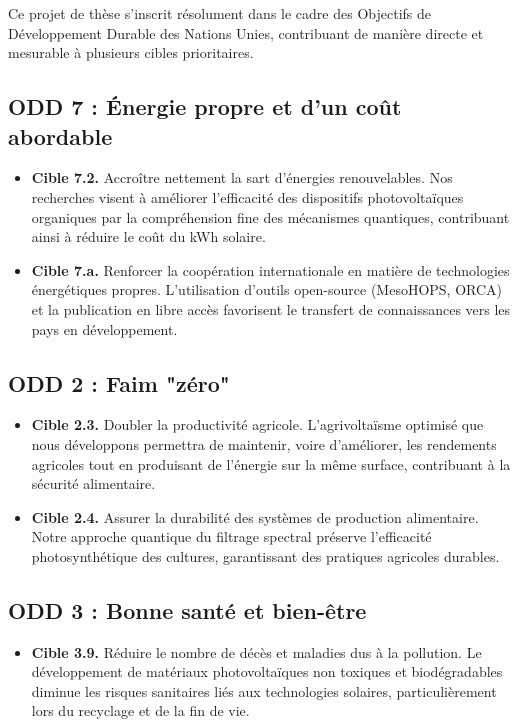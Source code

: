 \documentclass[12pt, a4paper]{article}
\begin{document}
Ce projet de thèse s'inscrit résolument dans le cadre des Objectifs de Développement Durable des Nations Unies, contribuant de manière directe et mesurable à plusieurs cibles prioritaires.

\subsection{ODD 7 : Énergie propre et d'un coût abordable}

\begin{itemize}
    \item \textbf{Cible 7.2.} Accroître nettement la sart d'énergies renouvelables. Nos recherches visent à améliorer l'efficacité des dispositifs photovoltaïques organiques par la compréhension fine des mécanismes quantiques, contribuant ainsi à réduire le coût du kWh solaire.
    \item \textbf{Cible 7.a.} Renforcer la coopération internationale en matière de technologies énergétiques propres. L'utilisation d'outils open-source (MesoHOPS, ORCA) et la publication en libre accès favorisent le transfert de connaissances vers les pays en développement.
\end{itemize}

\subsection{ODD 2 : Faim "zéro"}

\begin{itemize}
    \item \textbf{Cible 2.3.} Doubler la productivité agricole. L'agrivoltaïsme optimisé que nous développons permettra de maintenir, voire d'améliorer, les rendements agricoles tout en produisant de l'énergie sur la même surface, contribuant à la sécurité alimentaire.
    \item \textbf{Cible 2.4.} Assurer la durabilité des systèmes de production alimentaire. Notre approche quantique du filtrage spectral préserve l'efficacité photosynthétique des cultures, garantissant des pratiques agricoles durables.
\end{itemize}

\subsection{ODD 3 : Bonne santé et bien-être}

\begin{itemize}
    \item \textbf{Cible 3.9.} Réduire le nombre de décès et maladies dus à la pollution. Le développement de matériaux photovoltaïques non toxiques et biodégradables diminue les risques sanitaires liés aux technologies solaires, particulièrement lors du recyclage et de la fin de vie.
\end{itemize}
\end{document}
